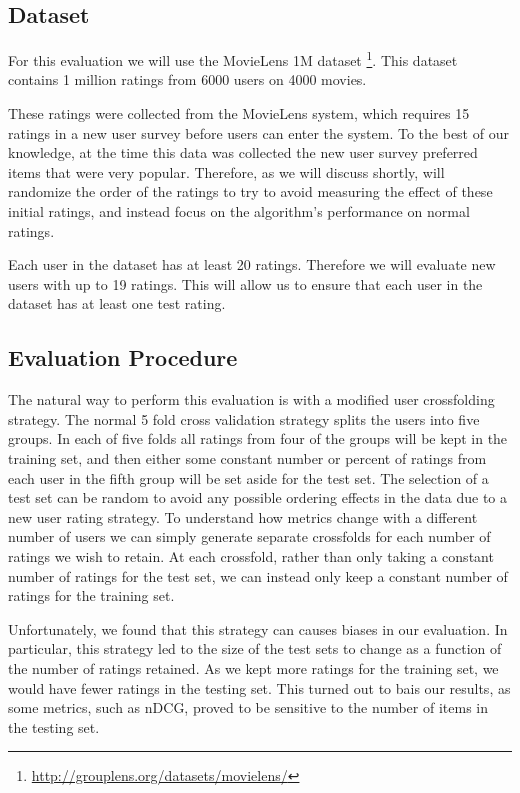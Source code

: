 \documentclass[letterpaper]{sig-alternate}
\begin{document}
  
  \subsection*{Dataset}
  For this evaluation we will use the MovieLens 1M dataset \footnote{\url{http://grouplens.org/datasets/movielens/}}.
  This dataset contains 1 million ratings from 6000 users on 4000 movies.
  
  These ratings were collected from the MovieLens system, which requires 15 ratings in a new user survey before users can enter the system.
  To the best of our knowledge, at the time this data was collected the new user survey preferred items that were very popular.
  Therefore, as we will discuss shortly, will randomize the order of the ratings to try to avoid measuring the effect of these initial ratings, and instead focus on the algorithm's performance on normal ratings.
  
  Each user in the dataset has at least 20 ratings.
  Therefore we will evaluate new users with up to 19 ratings.
  This will allow us to ensure that each user in the dataset has at least one test rating.

  
  \subsection*{Evaluation Procedure}
  The natural way to perform this evaluation is with a modified user crossfolding strategy.
  The normal 5 fold cross validation strategy splits the users into five groups.
  In each of five folds all ratings from four of the groups will be kept in the training set, and then either some constant number or percent of ratings from each user in the fifth group will be set aside for the test set.
  The selection of a test set can be random to avoid any possible ordering effects in the data due to a new user rating strategy.
  To understand how metrics change with a different number of users we can simply generate separate crossfolds for each number of ratings we wish to retain.
  At each crossfold, rather than only taking a constant number of ratings for the test set, we can instead only keep a constant number of ratings for the training set.
  
  Unfortunately, we found that this strategy can causes biases in our evaluation.
  In particular, this strategy led to the size of the test sets to change as a function of the number of ratings retained.
  As we kept more ratings for the training set, we would have fewer ratings in the testing set.
  This turned out to bais our results, as some metrics, such as nDCG, proved to be sensitive to the number of items in the testing set.
  
\end{document}
